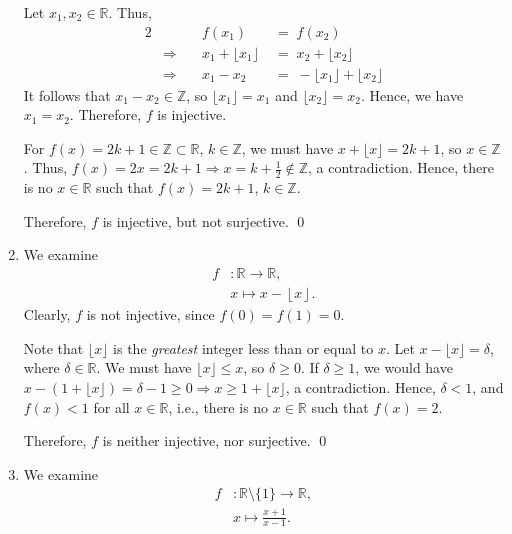 \documentclass[10pt]{article}
\begin{document}
\begin{enumerate}
                Let $x_1, x_2 \in \mathbb{R}$. Thus,
                \begin{alignat*}{2}
                        &&f(x_1) \;&=\; f(x_2) \\
                        &\Rightarrow\quad& x_1 + \lfloor x_1\rfloor \;&=\; x_2 + \lfloor x_2\rfloor \\
                        &\Rightarrow\quad& x_1 - x_2 \;&=\; -\lfloor x_1\rfloor + \lfloor x_2\rfloor
                \end{alignat*}
                It follows that $x_1 - x_2 \in \mathbb{Z}$, so $\lfloor x_1\rfloor = x_1$ and $\lfloor x_2\rfloor = x_2$.
                Hence, we have $x_1 = x_2$. Therefore, $f$ is injective.

                For $f(x) = 2k + 1 \in \mathbb{Z} \subset \mathbb{R}$, $k \in \mathbb{Z}$, we must have $x + \lfloor x \rfloor = 2k + 1$, so 
                $x \in \mathbb{Z}$. Thus, $f(x) = 2x = 2k + 1 \Rightarrow x = k + \frac{1}{2} \notin \mathbb{Z}$, a contradiction. Hence, there
                is no $x \in \mathbb{R}$ such that $f(x) = 2k + 1$, $k \in \mathbb{Z}$.
                
                Therefore, $f$ is injective, but not surjective. \qed

                \item We examine
                \begin{align*}
                        f&: \mathbb{R} \to \mathbb{R},\\
                        &x \mapsto x - \left\lfloor x \right\rfloor .
                \end{align*}
                Clearly, $f$ is not injective, since $f(0) = f(1) = 0$.

                Note that $\lfloor x\rfloor$ is the \textit{greatest} integer less than or equal to $x$.
                Let $x - \lfloor x\rfloor = \delta$, where $\delta \in \mathbb{R}$.
                We must have $\lfloor x\rfloor \leq x$, so $\delta \geq 0$.
                If $\delta \geq 1$, we would have 
                $x - (1 + \lfloor x\rfloor) = \delta - 1 \geq 0 \Rightarrow x \geq 1 + \lfloor x\rfloor$, a contradiction.
                Hence, $\delta < 1$, and $f(x) < 1$ for all $x \in \mathbb{R}$, i.e., there is no $x \in \mathbb{R}$ such that $f(x) = 2$.

                Therefore, $f$ is neither injective, nor surjective. \qed

                \item We examine
                \begin{align*}
                        f&: \mathbb{R}\setminus\{1\} \to \mathbb{R},\\
                        &x \mapsto \frac{x+1}{x-1} .
                \end{align*}


\end{enumerate}
\end{document}
